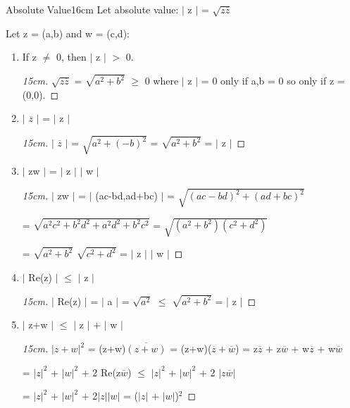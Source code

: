	\begin{definition}{Absolute Value}{16cm}
		Let absolute value: $|$ z $|$ = $\sqrt{z \overline{z}}$

		Let z = (a,b) and w = (c,d):
	\end{definition}
	
	\begin{enumerate}[label=(\alph*), leftmargin=2cm, itemsep=0.1cm]
		\item If z $\neq$ 0, then $|$ z $|$ $>$ 0.

			\begin{proof}[15cm]
				$\sqrt{z\overline{z}}$ = $\sqrt{a^2 + b^2}$ $\geq$ 0
				where $|$ z $|$ = 0 only if a,b = 0 so only if z = (0,0).
			\end{proof}

		\item $|$ $\overline{z}$ $|$ = $|$ z  $|$
			
			\begin{proof}[15cm]
				$|$ $\overline{z}$ $|$ = $\sqrt{a^2 + (-b)^2}$
				= $\sqrt{a^2 + b^2}$ = $|$ z $|$
			\end{proof}

		\item $|$ zw $|$ = $|$ z $|$ $|$ w $|$
		
			\begin{proof}[15cm]
				$|$ zw $|$ = $|$ (ac-bd,ad+bc) $|$ = $\sqrt{(ac-bd)^2 + (ad+bc)^2}$
			
				= $\sqrt{a^2c^2 + b^2d^2 + a^2d^2 + b^2c^2}$
				= $\sqrt{(a^2+b^2)(c^2+d^2)}$

				= $\sqrt{a^2+b^2}$ $\sqrt{c^2+d^2}$ = $|$ z $|$ $|$ w $|$
			\end{proof}

		\item $|$ Re(z) $|$ $\leq$ $|$ z $|$

			\begin{proof}[15cm]
				$|$ Re(z) $|$ = $|$ a $|$ = $\sqrt{a^2}$
				$\leq$ $\sqrt{a^2+b^2}$ = $|$ z $|$
			\end{proof}

		\item $|$ z+w $|$ $ \leq $  $|$ z $|$ + $|$ w $|$
		
			\begin{proof}[15cm]
				$| z+w |^2$ = (z+w)$\overline{(z+w)}$
				= (z+w)($\overline{z} + \overline{w}$)
				= z$\overline{z}$ + z$\overline{w}$
				+ w$\overline{z}$ + w$\overline{w}$
			
				= $|z|^2$ + $|w|^2$ + 2 Re(z$\overline{w}$)
				$\leq$ $|z|^2$ + $|w|^2$ + 2 $|z\overline{w}|$

				= $|z|^2$ + $|w|^2$ + 2$|z||w|$
				= ($|z|$ + $|w|$)$^2$				
			\end{proof}
	\end{enumerate}

